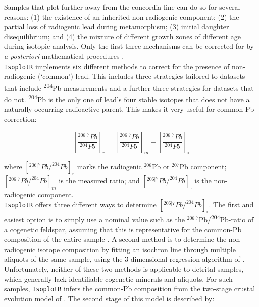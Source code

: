 \documentclass{article}
\begin{document}
Samples that plot further away from the concordia line can do so for
several reasons: (1) the existence of an inherited non-radiogenic
component; (2) the partial loss of radiogenic lead during
metamorphism; (3) initial daughter disequilibrium; and (4) the mixture
of different growth zones of different age during isotopic
analysis. Only the first three mechanisms can be corrected for by
\emph{a posteriori} mathematical procedures \citep{mclean2011}.\\

\texttt{IsoplotR} implements six different methods to correct for the
presence of non-radiogenic (`common') lead. This includes three
strategies tailored to datasets that include \textsuperscript{204}Pb
measurements and a further three strategies for datasets that do not.
\textsuperscript{204}Pb is the only one of lead's four stable isotopes
that does not have a naturally occurring radioactive parent. This
makes it very useful for common-Pb correction:

\begin{equation}
  \left[\frac{{}^{206|7}Pb}{{}^{204}Pb}\right]_r =
  \left[\frac{{}^{206|7}Pb}{{}^{204}Pb}\right]_m -
  \left[\frac{{}^{206|7}Pb}{{}^{204}Pb}\right]_\circ
  \label{eq:common-Pb}
\end{equation}

\noindent where $[{}^{206|7}Pb/^{204}Pb]_r$ marks the radiogenic
${}^{206}$Pb or ${}^{207}$Pb component; $[{}^{206|7}Pb/^{204}Pb]_m$ is
the measured ratio; and $[{}^{206|7}Pb/^{204}Pb]_\circ$ is the
non-radiogenic component.\\

\texttt{IsoplotR} offers three different ways to determine
$[{}^{206|7}Pb/^{204}Pb]_\circ$. The first and easiest option is to
simply use a nominal value such as the
${}^{206|7}$Pb/\textsuperscript{204}Pb-ratio of a cogenetic feldspar,
assuming that this is representative for the common-Pb composition of
the entire sample \citep[e.g.,][]{chew2014}. A second method is to
determine the non-radiogenic isotope composition by fitting an
isochron line through multiple aliquots of the same sample, using the
3-dimensional regression algorithm of \citet{ludwig1998}.\\


Unfortunately, neither of these two methods is applicable to detrital
samples, which generally lack identifiable cogenetic minerals and
aliquots. For such samples, \texttt{IsoplotR} infers the common-Pb
composition from the two-stage crustal evolution model of
\citet{stacey1975}. The second stage of this model is described by:
\end{document}
